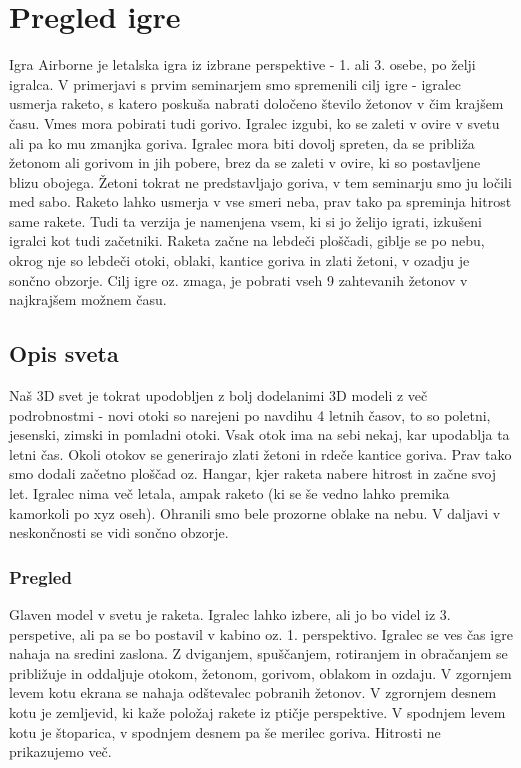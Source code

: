 \documentclass[a4paper]{article}
\begin{document}
\section{Pregled igre}
Igra Airborne je letalska igra iz izbrane perspektive - 1. ali 3. osebe, po želji igralca. V primerjavi s prvim seminarjem smo spremenili cilj igre - igralec usmerja raketo, s katero poskuša nabrati določeno število žetonov v čim krajšem času. Vmes mora pobirati tudi gorivo. Igralec izgubi, ko se  zaleti v ovire v svetu ali pa ko mu zmanjka goriva. Igralec mora biti dovolj spreten, da se približa žetonom ali gorivom in jih pobere, brez da se zaleti v ovire, ki so postavljene blizu obojega. Žetoni tokrat ne predstavljajo goriva, v tem seminarju smo ju ločili med sabo. Raketo lahko usmerja v vse smeri neba, prav tako pa spreminja hitrost same rakete. Tudi ta verzija je namenjena vsem, ki si jo želijo igrati, izkušeni igralci kot tudi začetniki. Raketa začne na lebdeči ploščadi, giblje se po nebu, okrog nje so lebdeči otoki, oblaki, kantice goriva in zlati žetoni, v ozadju je sončno obzorje. Cilj igre oz. zmaga, je pobrati vseh 9 zahtevanih žetonov v najkrajšem možnem času. 

\subsection{Opis sveta}
Naš 3D svet je tokrat upodobljen z bolj dodelanimi 3D modeli z več podrobnostmi - novi otoki so narejeni po navdihu 4 letnih časov, to so poletni, jesenski, zimski in pomladni otoki. Vsak otok ima na sebi nekaj, kar upodablja ta letni čas. Okoli otokov se generirajo zlati žetoni in rdeče kantice goriva. Prav tako smo dodali začetno ploščad oz. Hangar, kjer raketa nabere hitrost in začne svoj let. Igralec nima več letala, ampak raketo (ki se še vedno lahko premika kamorkoli po xyz oseh). Ohranili smo bele prozorne oblake na nebu. V daljavi v neskončnosti se vidi sončno obzorje.

\subsubsection{Pregled}
Glaven model v svetu je raketa. Igralec lahko izbere, ali jo bo videl iz 3. perspetive, ali pa se bo postavil v kabino oz. 1. perspektivo. Igralec se ves čas igre nahaja na sredini zaslona. Z dviganjem, spuščanjem, rotiranjem in obračanjem se približuje in oddaljuje otokom, žetonom, gorivom, oblakom in ozdaju. V zgornjem levem kotu ekrana se nahaja odštevalec pobranih žetonov. V zgrornjem desnem kotu je zemljevid, ki kaže položaj rakete iz ptičje perspektive. V spodnjem levem kotu je štoparica, v spodnjem desnem pa še merilec goriva. Hitrosti ne prikazujemo več.
\end{document}

